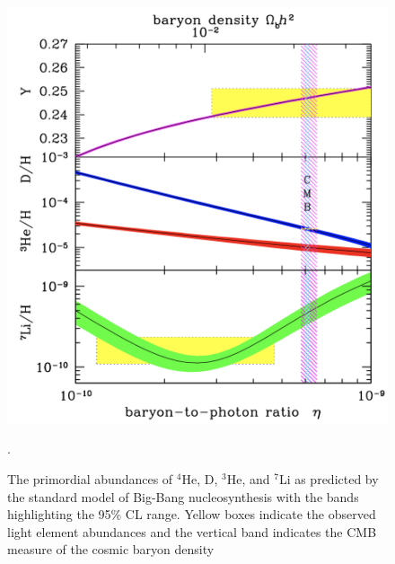 \begin{figure}[ht!]
    \begin{center}
        \includegraphics[scale=0.45]{Chapter_1/Figures/BBN_primordial_abundance.jpg}
        \caption[The primordial abundances of $^4$He, D, $^3$He, and $^7$Li as predicted by the standard model of Big-Bang nucleosynthesis]%
        {The primordial abundances of $^4$He, D, $^3$He, and $^7$Li as predicted by the standard model of Big-Bang nucleosynthesis with the bands highlighting the 95\% CL range. Yellow boxes indicate the observed light element abundances and the vertical band indicates the CMB measure of the cosmic baryon density \cite{BBN_figure}}.
        \label{fig:primordial_abundance}
        \end{center}
\end{figure}

